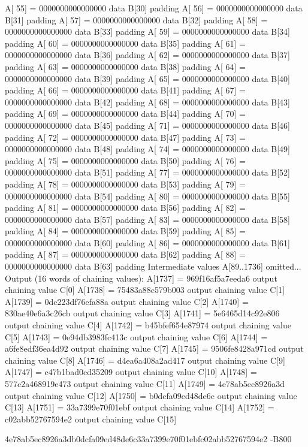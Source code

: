 A[  55] = 0000000000000000 data B[30] padding
A[  56] = 0000000000000000 data B[31] padding
A[  57] = 0000000000000000 data B[32] padding
A[  58] = 0000000000000000 data B[33] padding
A[  59] = 0000000000000000 data B[34] padding
A[  60] = 0000000000000000 data B[35] padding
A[  61] = 0000000000000000 data B[36] padding
A[  62] = 0000000000000000 data B[37] padding
A[  63] = 0000000000000000 data B[38] padding
A[  64] = 0000000000000000 data B[39] padding
A[  65] = 0000000000000000 data B[40] padding
A[  66] = 0000000000000000 data B[41] padding
A[  67] = 0000000000000000 data B[42] padding
A[  68] = 0000000000000000 data B[43] padding
A[  69] = 0000000000000000 data B[44] padding
A[  70] = 0000000000000000 data B[45] padding
A[  71] = 0000000000000000 data B[46] padding
A[  72] = 0000000000000000 data B[47] padding
A[  73] = 0000000000000000 data B[48] padding
A[  74] = 0000000000000000 data B[49] padding
A[  75] = 0000000000000000 data B[50] padding
A[  76] = 0000000000000000 data B[51] padding
A[  77] = 0000000000000000 data B[52] padding
A[  78] = 0000000000000000 data B[53] padding
A[  79] = 0000000000000000 data B[54] padding
A[  80] = 0000000000000000 data B[55] padding
A[  81] = 0000000000000000 data B[56] padding
A[  82] = 0000000000000000 data B[57] padding
A[  83] = 0000000000000000 data B[58] padding
A[  84] = 0000000000000000 data B[59] padding
A[  85] = 0000000000000000 data B[60] padding
A[  86] = 0000000000000000 data B[61] padding
A[  87] = 0000000000000000 data B[62] padding
A[  88] = 0000000000000000 data B[63] padding
Intermediate values A[89..1736] omitted... 
Output (16 words of chaining values):
A[1737] = 969f16af5a7eeda6 output chaining value C[0]
A[1738] = 75483a88c579b003 output chaining value C[1]
A[1739] = 0dc223df76efa88a output chaining value C[2]
A[1740] = 830ae40e6a3c26cb output chaining value C[3]
A[1741] = 5e6465d14c92e806 output chaining value C[4]
A[1742] = b45bfef654e87974 output chaining value C[5]
A[1743] = 0e94db3983fc413c output chaining value C[6]
A[1744] = a6fe8edf36ea4d92 output chaining value C[7]
A[1745] = 9506fe8428a971cd output chaining value C[8]
A[1746] = d4ea6a408a2ad417 output chaining value C[9]
A[1747] = c47b1bad0cd35209 output chaining value C[10]
A[1748] = 577c2a468919e473 output chaining value C[11]
A[1749] = 4e78ab5ec8926a3d output chaining value C[12]
A[1750] = b0dcfa09ed48de6c output chaining value C[13]
A[1751] = 33a7399e70f01ebf output chaining value C[14]
A[1752] = c02abb52767594e2 output chaining value C[15]

4e78ab5ec8926a3db0dcfa09ed48de6c33a7399e70f01ebfc02abb52767594e2 -B800
